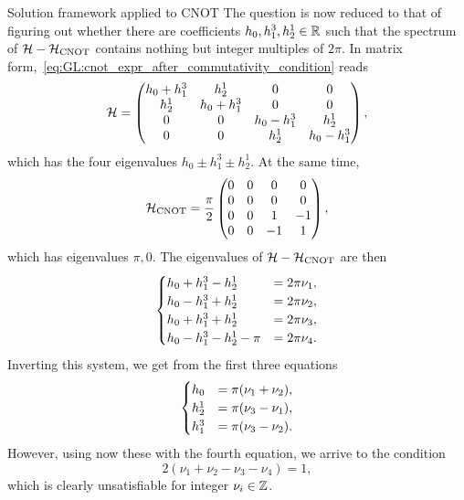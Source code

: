\begin{examplebox}[label={ex:GL:cnot_with_conditions}]{Solution framework applied to CNOT}
The question is now reduced to that of figuring out whether there are coefficients $h_0,h_1^3,h_2^1\in{\mathbb{R}}$ such that the spectrum of ${\mathcal{H}}-{\mathcal{H}}_{\operatorname{CNOT}}$ contains nothing but integer multiples of $2\pi$.
In matrix form,~\cref{eq:GL:cnot_expr_after_commutativity_condition} reads
\begin{equation}
    {\mathcal{H}} = \begin{pmatrix}
        h_0 + h_1^3 & h_2^1 & 0 & 0 \\
        h_2^1 & h_0 + h_1^3 & 0 & 0 \\
        0 & 0 & h_0 - h_1^3 & h_2^1 \\
        0 & 0 & h_2^1 & h_0 - h_1^3
    \end{pmatrix},
\end{equation}
which has the four eigenvalues $h_0\pm h_1^3 \pm h_2^1$.
At the same time,
\begin{equation}
    {\mathcal{H}}_{\operatorname{CNOT}} = \frac{\pi}{2}\begin{pmatrix}
        0 & 0 & 0 & 0 \\
        0 & 0 & 0 & 0 \\
        0 & 0 & 1 & -1 \\
        0 & 0 & -1 & 1
    \end{pmatrix},
\end{equation}
which has eigenvalues $\pi,0$. The eigenvalues of ${\mathcal{H}}-{\mathcal{H}}_{\operatorname{CNOT}}$ are then
\begin{equation}
\def\id{h_0}
\def\Z1{h_1^3}
\def\X2{h_2^1}
\begin{cases}
    \id + \Z1 - \X2 &= 2\pi \nu_1, \\
    \id - \Z1 + \X2 &= 2\pi \nu_2, \\
    \id + \Z1 + \X2 &= 2\pi \nu_3, \\
    \id - \Z1 - \X2 - \pi &= 2\pi \nu_4.
\end{cases}
\end{equation}
Inverting this system, we get from the first three equations
\begin{equation}
\def\id{h_0}
\def\Z1{h_1^3}
\def\X2{h_2^1}
\begin{cases}
    \id &= \pi (\nu_1 + \nu_2), \\
    \X2 &= \pi (\nu_3 - \nu_1), \\
    \Z1 &= \pi (\nu_3 - \nu_2).
\end{cases}
\end{equation}
However, using now these with the fourth equation, we arrive to the condition
\begin{equation}
    2(\nu_1 + \nu_2 - \nu_3 - \nu_4) = 1,
\end{equation}
which is clearly unsatisfiable for integer $\nu_i\in{\mathbb{Z}}$.


\end{examplebox}
